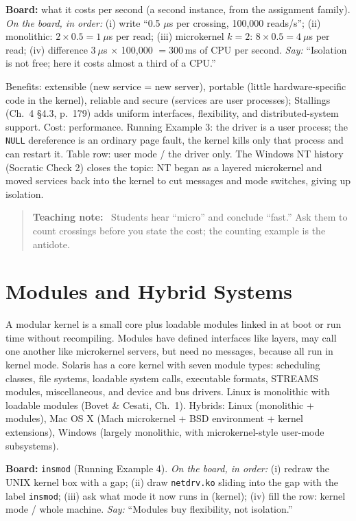 \documentclass[11pt]{article}
\newenvironment{teachingaside}{\begin{quote}\small\color{primary-gold}\textbf{Teaching note:}\ }{\end{quote}}
\begin{document}
\textbf{Board:} what it costs per second (a second instance, from the assignment family). \emph{On the board, in order:} (i) write ``0.5 $\mu$s per crossing, 100{,}000 reads/s''; (ii) monolithic: $2 \times 0.5 = 1~\mu$s per read; (iii) microkernel $k=2$: $8 \times 0.5 = 4~\mu$s per read; (iv) difference $3~\mu$s $\times$ 100{,}000 $= 300$\,ms of CPU per second. \emph{Say:} ``Isolation is not free; here it costs almost a third of a CPU.''

Benefits: extensible (new service = new server), portable (little hardware-specific code in the kernel), reliable and secure (services are user processes); Stallings (Ch.~4 \S4.3, p.~179) adds uniform interfaces, flexibility, and distributed-system support. Cost: performance. Running Example 3: the driver is a user process; the \texttt{NULL} dereference is an ordinary page fault, the kernel kills only that process and can restart it. Table row: user mode / the driver only. The Windows NT history (Socratic Check 2) closes the topic: NT began as a layered microkernel and moved services back into the kernel to cut messages and mode switches, giving up isolation.

\begin{teachingaside}
Students hear ``micro'' and conclude ``fast.'' Ask them to count crossings before you state the cost; the counting example is the antidote.
\end{teachingaside}

\section{Modules and Hybrid Systems}

A modular kernel is a small core plus loadable modules linked in at boot or run time without recompiling. Modules have defined interfaces like layers, may call one another like microkernel servers, but need no messages, because all run in kernel mode. Solaris has a core kernel with seven module types: scheduling classes, file systems, loadable system calls, executable formats, STREAMS modules, miscellaneous, and device and bus drivers. Linux is monolithic with loadable modules (Bovet \& Cesati, Ch.~1). Hybrids: Linux (monolithic + modules), Mac OS X (Mach microkernel + BSD environment + kernel extensions), Windows (largely monolithic, with microkernel-style user-mode subsystems).

\textbf{Board:} \texttt{insmod} (Running Example 4). \emph{On the board, in order:} (i) redraw the UNIX kernel box with a gap; (ii) draw \texttt{netdrv.ko} sliding into the gap with the label \texttt{insmod}; (iii) ask what mode it now runs in (kernel); (iv) fill the row: kernel mode / whole machine. \emph{Say:} ``Modules buy flexibility, not isolation.''
\end{document}
